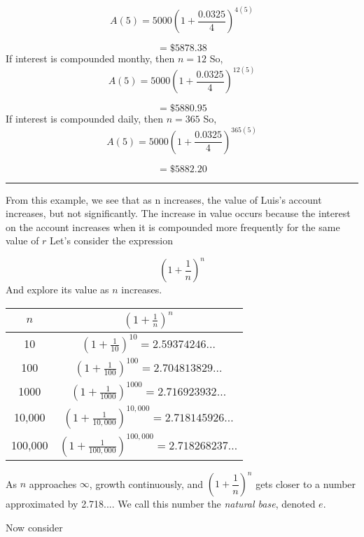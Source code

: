 \documentclass{report}
\begin{document}
  $$ A(5) = 5000\left(1 + \dfrac{0.0325}{4}\right)^{4(5)}$$
  
  $$ = \$ 5878.38$$
  \bigbreak \noindent
  \bigbreak \noindent
  If interest is compounded monthy, then $n = 12$
  \bigbreak \noindent
  So,
  $$ A(5) = 5000\left(1 + \dfrac{0.0325}{4}\right)^{12(5)}$$

  $$ = \$5880.95$$
  \bigbreak \noindent
  \bigbreak \noindent
  If interest is compounded daily, then $ n = 365$
  \bigbreak \noindent
  So,
  $$ A(5) = 5000\left(1 + \dfrac{0.0325}{4}\right)^{365(5)}$$

  $$ = \$5882.20$$
  \bigbreak \noindent
  \hrule
  \bigbreak \noindent
  From this example, we see that as n increases, the value of Luis's account increases, but not significantly. The increase in value occurs because the interest on the account increases when it is compounded more frequently for the same value of $r$
  \bigbreak \noindent
  Let's consider the expression

  $$ \left(1+\dfrac{1}{n}\right)^n$$
  And explore its value as $n$ increases. 
  \bigbreak \noindent
    \renewcommand{\arraystretch}{1.5}
    \begin{table}[h]
    \begin{center}
        \begin{tabular}{|c|c|}
            \hline
            $n$ & $\left(1+\frac{1}{n}\right)^n$ \\
            \hline
            10 & $\left(1+\frac{1}{10}\right)^{10}=2.59374246 \ldots$ \\
            100 & $\left(1+\frac{1}{100}\right)^{100}=2.704813829 \ldots$ \\
            1000 & $\left(1+\frac{1}{1000}\right)^{1000}=2.716923932 \ldots$ \\
            10,000 & $\left(1+\frac{1}{10,000}\right)^{10,000}=2.718145926 \ldots$ \\
            100,000 & $\left(1+\frac{1}{100,000}\right)^{100,000}=2.718268237 \ldots$ \\
            \hline
        \end{tabular} 
  \end{center} 
    \end{table}
\bigbreak \noindent
As $n$ approaches $\infty$, growth continuously, and $\left(1 + \dfrac{1}{n}\right)^n$ gets closer to a number approximated by 2.718.... We call this number the \textit{natural base}, denoted $e$.

\pagebreak
\noindent
Now consider
\end{document}
